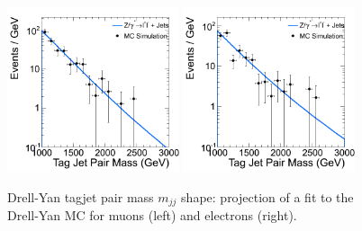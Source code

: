 \begin{figure}
\begin{center}
\includegraphics[width=0.45\textwidth]{figs/wpj/EWKW2jetstagjetmjj_ZpJ_muon_Model_12_Validate.png}
\includegraphics[width=0.45\textwidth]{figs/wpj/EWKW2jetstagjetmjj_ZpJ_electron_Model_12_Validate.png}
\end{center}
\caption{\label{fig:zjetFit} Drell-Yan tagjet pair mass $m_{jj}$ shape: projection of a fit to the Drell-Yan MC for muons (left) and electrons (right).}
\label{fig:zjetsFit_Dijet}
\end{figure}

